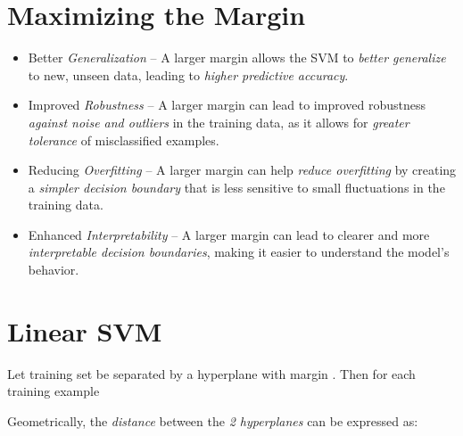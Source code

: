 \documentclass[
	number={2},
	title={Learning Linear Separators{,} SVMs and Kernels}
]{cs584notes}
\begin{document}
\section{Maximizing the Margin}\label{sec:maximizing-the-margin}
\begin{itemize}
	\item Better \emph{Generalization} -- A larger margin allows the SVM to \emph{better generalize} to new, unseen data, leading to \emph{higher predictive accuracy}.
	\item Improved \emph{Robustness} -- A larger margin can lead to improved robustness \emph{against noise and outliers} in the training data, as it allows for \emph{greater tolerance} of misclassified examples.
	\item Reducing \emph{Overfitting} -- A larger margin can help \emph{reduce overfitting} by creating a \emph{simpler decision boundary} that is less sensitive to small fluctuations in the training data.
	\item Enhanced \emph{Interpretability} -- A larger margin can lead to clearer and more \emph{interpretable decision boundaries}, making it easier to understand the model's behavior.
\end{itemize}

\section{Linear SVM}\label{sec:linear-svm}
Let training set  be separated by a hyperplane with margin \data{$\rho$}.
Then for each training example 


Geometrically, the \emph{distance} between the \emph{2 hyperplanes} can be expressed as:
\end{document}
